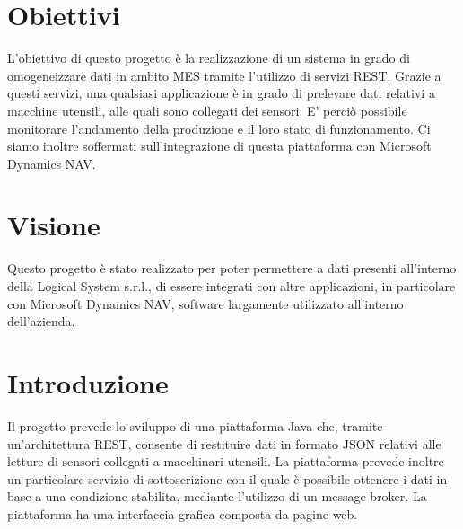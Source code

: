 \begin{titlepage}





 

\clearpage
\tableofcontents
\end{titlepage}
\section{Obiettivi}
L'obiettivo di questo progetto è la realizzazione di un sistema in grado di omogeneizzare dati in ambito MES tramite l'utilizzo di servizi REST. Grazie a questi servizi, una qualsiasi applicazione è in grado di prelevare dati relativi a macchine utensili, alle quali sono collegati dei sensori. E' perciò possibile monitorare l'andamento della produzione e il loro stato di funzionamento. Ci siamo inoltre soffermati sull'integrazione di questa piattaforma con Microsoft Dynamics NAV.
\section{Visione}
Questo progetto è stato realizzato per poter permettere a dati presenti all'interno della Logical System s.r.l., di essere integrati con altre applicazioni, in particolare con Microsoft Dynamics NAV, software largamente utilizzato all'interno dell'azienda.
\section{Introduzione}
Il progetto prevede lo sviluppo di una piattaforma Java che, tramite un'architettura REST, consente di restituire dati in formato JSON relativi alle letture di sensori collegati a macchinari utensili. La piattaforma prevede inoltre un particolare servizio di sottoscrizione con il quale è possibile ottenere i dati in base a una condizione stabilita, mediante l’utilizzo di un message broker. La piattaforma ha una interfaccia grafica composta da pagine web.
\clearpage
